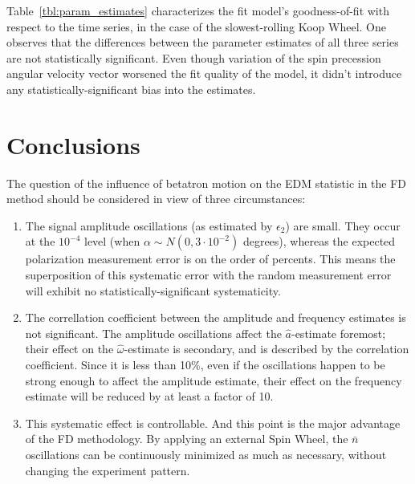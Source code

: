 \documentclass[a4paper]{jacow}
\newcommand{\w}{\omega}
\newcommand{\nbar}{\bar n}
\begin{document}
Table~\ref{tbl:param_estimates} characterizes the fit model's goodness-of-fit with respect to the time series,
in the case of the slowest-rolling Koop Wheel.
One observes that the differences between the parameter estimates of all three series are not
statistically significant. Even though variation of the spin precession angular velocity vector worsened
the fit quality of the model, it didn't introduce any statistically-significant bias
into the estimates.

\section{Conclusions}
The question of the influence of betatron motion on the EDM statistic in the FD method should be considered
in view of three circumstances:
\begin{enumerate}
\item The signal amplitude oscillations (as estimated by $\epsilon_2$) are small.
  They occur at the $10^{-4}$ level (when $\alpha\sim N(0, 3\cdot 10^{-2})$ degrees), whereas
  the expected polarization measurement error is on the order of percents.
  This means the superposition of this systematic error with the random measurement error
  will exhibit no statistically-significant systematicity.
\item The correllation coefficient between the amplitude and frequency estimates is not significant. The amplitude
  oscillations affect the $\hat a$-estimate foremost; their effect on the $\hat\w$-estimate is secondary, and is
  described by the correlation coefficient. Since it is less than 10\%, even if the oscillations happen to be
  strong enough to affect the amplitude estimate, their effect on the frequency estimate will be reduced by
  at least a factor of 10.
\item This systematic effect is controllable. And this point is the major advantage of the FD methodology.
  By applying an external Spin Wheel, the $\nbar$ oscillations can be continuously minimized
  as much as necessary, without changing the experiment pattern.
\end{enumerate}
\end{document}
